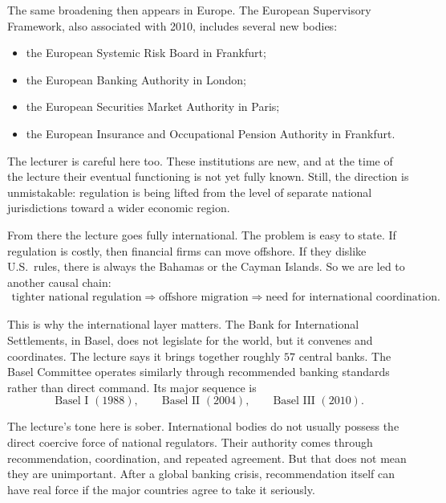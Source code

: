 The same broadening then appears in Europe. The European Supervisory Framework, also associated with 2010, includes several new bodies:
\begin{itemize}
\item the European Systemic Risk Board in Frankfurt;
\item the European Banking Authority in London;
\item the European Securities Market Authority in Paris;
\item the European Insurance and Occupational Pension Authority in Frankfurt.
\end{itemize}

The lecturer is careful here too. These institutions are new, and at the time of the lecture their eventual functioning is not yet fully known. Still, the direction is unmistakable: regulation is being lifted from the level of separate national jurisdictions toward a wider economic region.

From there the lecture goes fully international. The problem is easy to state. If regulation is costly, then financial firms can move offshore. If they dislike U.S.\ rules, there is always the Bahamas or the Cayman Islands. So we are led to another causal chain:
\begin{align}
\text{tighter national regulation}
\Rightarrow
\text{offshore migration}
\Rightarrow
\text{need for international coordination}.
\end{align}

This is why the international layer matters. The Bank for International Settlements, in Basel, does not legislate for the world, but it convenes and coordinates. The lecture says it brings together roughly \(57\) central banks. The Basel Committee operates similarly through recommended banking standards rather than direct command. Its major sequence is
\begin{equation}
\text{Basel I }(1988),\qquad
\text{Basel II }(2004),\qquad
\text{Basel III }(2010).
\end{equation}

The lecture's tone here is sober. International bodies do not usually possess the direct coercive force of national regulators. Their authority comes through recommendation, coordination, and repeated agreement. But that does not mean they are unimportant. After a global banking crisis, recommendation itself can have real force if the major countries agree to take it seriously.

